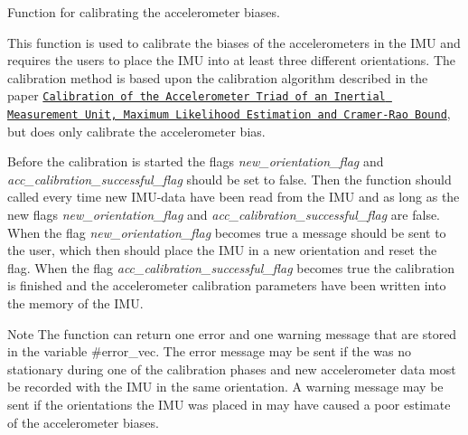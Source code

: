 \-Function for calibrating the accelerometer biases. 

\-This function is used to calibrate the biases of the accelerometers in the \-I\-M\-U and requires the users to place the \-I\-M\-U into at least three different orientations. \-The calibration method is based upon the calibration algorithm described in the paper \href{https://eeweb01.ee.kth.se/upload/publications/reports/2010/IR-EE-SB_2010_046.pdf}{\tt \-Calibration of the \-Accelerometer \-Triad of an \-Inertial \-Measurement \-Unit, \-Maximum \-Likelihood \-Estimation and \-Cramer-\/\-Rao \-Bound}, but does only calibrate the accelerometer bias.

\-Before the calibration is started the flags {\itshape new\-\_\-orientation\-\_\-flag\/} and {\itshape acc\-\_\-calibration\-\_\-successful\-\_\-flag\/} should be set to false. \-Then the function should called every time new \-I\-M\-U-\/data have been read from the \-I\-M\-U and as long as the new flags {\itshape new\-\_\-orientation\-\_\-flag\/} and {\itshape acc\-\_\-calibration\-\_\-successful\-\_\-flag\/} are false. \-When the flag {\itshape new\-\_\-orientation\-\_\-flag\/} becomes true a message should be sent to the user, which then should place the \-I\-M\-U in a new orientation and reset the flag. \-When the flag {\itshape acc\-\_\-calibration\-\_\-successful\-\_\-flag\/} becomes true the calibration is finished and the accelerometer calibration parameters have been written into the memory of the \-I\-M\-U.

\begin{DoxyNote}{\-Note}
\-The function can return one error and one warning message that are stored in the variable \#error\-\_\-vec. \-The error message may be sent if the was no stationary during one of the calibration phases and new accelerometer data most be recorded with the \-I\-M\-U in the same orientation. \-A warning message may be sent if the orientations the \-I\-M\-U was placed in may have caused a poor estimate of the accelerometer biases.
\end{DoxyNote}

